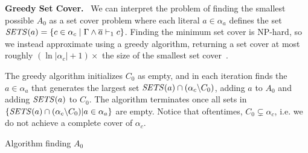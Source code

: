 %


\noindent \textbf{Greedy Set Cover.}~\label{subsec:sym}
We can interpret the problem of finding the smallest possible $A_0$ as a set
cover problem where each literal $a \in \alpha_a$ defines the set  ${\it
SETS}(a) = \{ c \in \alpha_c \; | \; \Gamma \land \overline{a} \vdash_1 c\}$. Finding
the minimum set cover is NP-hard, so we instead approximate using a greedy
algorithm, returning a set cover at most roughly $(\ln |\alpha_c| + 1)\times$
the size of the smallest set cover~\cite{greedysetcover}. 




The greedy algorithm initializes $C_0$ as empty, and in each iteration finds the
$a \in \alpha_a$ that generates the largest set ${\it SETS}(a) \cap (\alpha_c
\backslash C_0)$, adding $a$ to $A_0$ and adding ${\it SETS}(a)$ to $C_0$. The
algorithm terminates once all sets in $\{{\it SETS}(a) \cap (\alpha_c \backslash
C_0) | a \in \alpha_a \}$ are empty. Notice that oftentimes, $C_0 \subsetneq \alpha_c$,
i.e. we do not achieve a complete cover of $\alpha_c$.


\begin{algorithm}
    \caption{Algorithm finding $A_0$}\label{alg:finda0} \SetAlgoNoLine
     
      
\end{algorithm}

